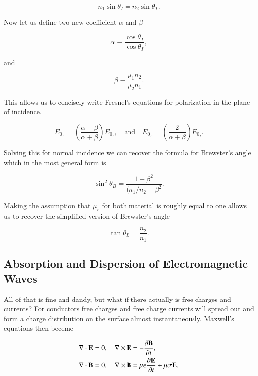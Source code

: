 \documentclass[preprint, review,12pt]{elsarticle}
\def\x{\times}
\def\.{\cdot}
\def\b{\textbf}
\def\={\equiv}
\def\div{\nabla \.}
\def\curl{\nabla \x}
\def\and{\quad \text{and} \quad}
\def\9{\left(}
\def\0{\right)}
\newcommand{\pd}[2]{\frac{\partial #1 }{\partial #2}}
\begin{document}
\begin{equation}
      n_1 \sin\theta_I = n_2\sin\theta_T.
\end{equation}

Now let us define two new coefficient $\alpha$ and $\beta$

\begin{equation}
    \alpha \= \frac{\cos\theta_T}{\cos\theta_I},
\end{equation}

and

\begin{equation}
    \beta \= \frac{\mu_1n_2}{\mu_2n_1}.
\end{equation}

This allows us to concisely write Fresnel's equations for polarization in the plane of incidence. 

\begin{equation}
    E_{0_R} = \9 \frac{\alpha - \beta}{\alpha + \beta} \0 E_{0_I}, \and E_{0_T} = \9\frac{2}{\alpha + \beta}\0 E_{0_I}.
\end{equation}

Solving this for normal incidence we can recover the formula for Brewster's angle which in the most general form is

\begin{equation}
    \sin^2\theta_B = \frac{1-\beta^2}{(n_1/n_2 -\beta^2}.
\end{equation}

Making the assumption that $\mu_r$ for both material is roughly equal to one allows us to recover the simplified version of Brewster's angle

\begin{equation}
    \tan\theta_B = \frac{n_2}{n_1}.
\end{equation}

\subsection{Absorption and Dispersion of Electromagnetic Waves}

 All of that is fine and dandy, but what if there actually is free charges and currents? For conductors free charges and free charge currents will spread out and form a charge distribution on the surface almost instantaneously. Maxwell's equations then become
 
\begin{equation}
\begin{split}
    & \div \b E = 0, \quad \curl \b E = -\pd{\b B}{t}, \\
    & \div \b B = 0, \quad \curl \b B = \mu \epsilon \pd{\b E}{t} + \mu \sigma \b E.
\end{split}
\end{equation}
\end{document}
